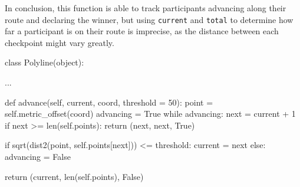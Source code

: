 In conclusion, this function is able to track participants advancing along their route and declaring the winner, but using \texttt{current} and \texttt{total} to determine how far a participant is on their route is imprecise, as the distance between each checkpoint might vary greatly.

\begin{code}[label={lst:sprint4-polyline}, caption={The Advance Function of Polyline}, language={Python}]
class Polyline(object):

	...

	def advance(self, current, coord, threshold = 50):
		point = self.metric_offset(coord)
		advancing = True
		while advancing:
			next = current + 1
			if next >= len(self.points):
				return (next, next, True)

			if sqrt(dist2(point, self.points[next])) <= threshold:
				current = next
			else:
				advancing = False

		return (current, len(self.points), False)
\end{code}
